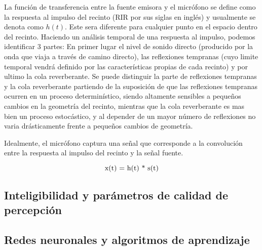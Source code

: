 La función de transferencia entre la fuente emisora y el micrófono se define como la respuesta al impulso del recinto (RIR por sus siglas en inglés) y usualmente se denota como $h(t)$. Este sera diferente para cualquier punto en el espacio dentro del recinto. Haciendo un análisis temporal de una respuesta al impulso, podemos identificar 3 partes: En primer lugar el nivel de sonido directo (producido por la onda que viaja a través de camino directo), las reflexiones tempranas (cuyo limite temporal vendrá definido por las características propias de cada recinto) y por ultimo la cola reverberante. Se puede distinguir la parte de reflexiones tempranas y la cola reverberante partiendo de la suposición de que las reflexiones tempranas ocurren en un proceso determinístico, siendo altamente sensibles a pequeños cambios en la geometría del recinto, mientras que la cola reverberante es mas bien un proceso estocástico, y al depender de un mayor número de reflexiones no varia drásticamente frente a pequeños cambios de geometría.  

Idealmente, el micrófono captura una señal que corresponde a la convolución entre la respuesta al impulso del recinto y la señal fuente.

\begin{equation}
\label{eqn:pythagorean}
	$x(t) = h(t) * s(t)$



\end{equation} 


\subsection{Inteligibilidad y parámetros de calidad de percepción}

\subsection{Redes neuronales y algoritmos de aprendizaje}


